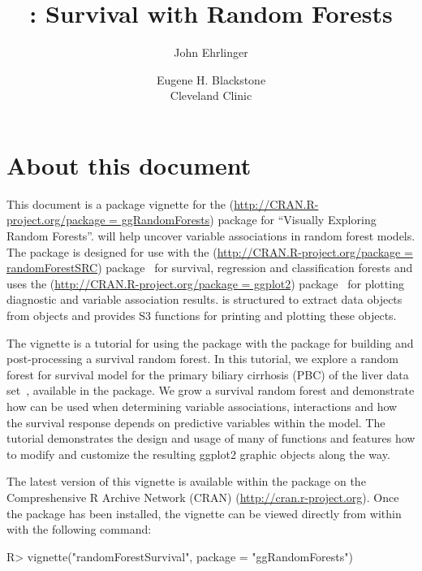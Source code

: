 \documentclass[nojss]{jss}\usepackage[]{graphicx}\usepackage[]{color}
\author{John Ehrlinger 
\and Eugene H. Blackstone\\Cleveland Clinic}
\title{\pkg{ggRandomForests}: Survival with Random Forests}
\begin{document}
\section*{About this document}

This document is a package vignette for the  (\url{http://CRAN.R-project.org/package = ggRandomForests}) package for ``Visually Exploring Random Forests''.  will help uncover variable associations in random forest models. The package is designed for use with the  (\url{http://CRAN.R-project.org/package = randomForestSRC}) package~\citep{Ishwaran:RFSRC:2014} for survival, regression and classification forests and uses the (\url{http://CRAN.R-project.org/package = ggplot2}) package~\citep{Wickham:2009} for plotting diagnostic and variable association results.  is  structured to extract data objects from  objects and provides S3 functions for printing and plotting these objects.

The vignette is a tutorial for using the  package with the  package for building and post-processing a survival random forest. In this tutorial, we explore a random forest for survival model for the primary biliary cirrhosis (PBC) of the liver data set~\citep{fleming:1991}, available in the  package. We grow a survival random forest and demonstrate how  can be used when determining variable associations, interactions and how the survival response depends on predictive variables within the model. The tutorial demonstrates the design and usage of many of  functions and features how to modify and customize the resulting ggplot2 graphic objects along the way.

The latest version of this vignette is available within the  package on the Compreshensive R Archive Network (CRAN) (\url{http://cran.r-project.org}). Once the package has been installed, the vignette can be viewed directly from within  with the following command:
\begin{Schunk}
\begin{Sinput}
R> vignette("randomForestSurvival", package = "ggRandomForests")
\end{Sinput}
\end{Schunk}
\end{document}
